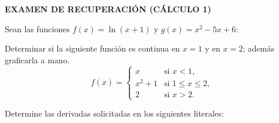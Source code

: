 \documentclass[12pt, answers]{exam} %
\begin{document}
\begin{center}
    \textbf{\large EXAMEN DE RECUPERACIÓN (CÁLCULO 1)}
\end{center}

\vspace{0.5cm}

\begin{questions}

    \question Sean las funciones \( f(x) = \ln(x + 1) \) y \( g(x) = x^2 - 5x + 6 \):

    \question Determinar si la siguiente función es continua en \( x = 1 \) y en \( x = 2 \); además graficarla a mano.
    \[
    f(x) = 
    \begin{cases} 
    x & \text{si } x < 1, \\
    x^2 + 1 & \text{si } 1 \leq x \leq 2, \\
    2 & \text{si } x > 2.
    \end{cases}
    \]

    \question Determine las derivadas solicitadas en los siguientes literales:


\end{questions}
\end{document}

